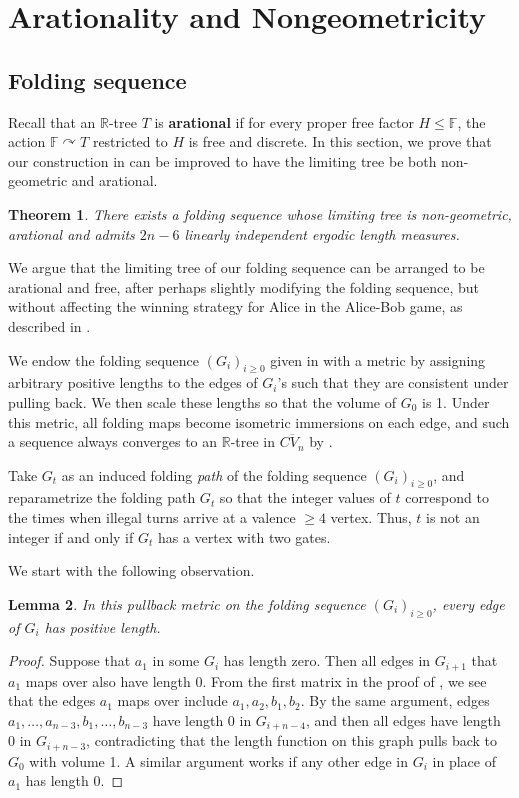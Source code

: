 \documentclass[11pt, letterpaper]{amsart}
\theoremstyle{plain}
\newtheorem{theorem}{Theorem}[section]
\newtheorem{lemma}[theorem]{Lemma}
\theoremstyle{definition}
\newcommand{\R}{\mathbb{R}}
\newcommand{\bbF}{\mathbb{F}}
\newcommand{\ov}[1]{\overline{#1}}
\begin{document}
\section{Arationality and Nongeometricity} \label{sec:arationality}
\subsection{Folding sequence}
Recall that an $\R$-tree $T$ is \textbf{arational} if for every proper free
factor $H \le \bbF$, the action $\bbF \curvearrowright T$ restricted to $H$ is
free and discrete. In this section, we prove that our construction in
 can be improved to have the limiting tree be both non-geometric and arational.
\begin{theorem} \label{thm:arational_folding}
    There exists a folding sequence whose limiting tree is non-geometric, arational and admits $2n-6$ linearly independent ergodic length measures.
\end{theorem}
We argue that the limiting tree of our folding sequence can be arranged to be arational and free, after perhaps slightly modifying the folding sequence, but without affecting the winning strategy for Alice in the Alice-Bob game, as described in . 

We endow the folding sequence $(G_i)_{i \ge 0}$ given in
 with a metric by assigning arbitrary
positive lengths to the edges of $G_i$'s such that they are consistent under
pulling back. We then scale these lengths so that the volume of $G_0$ is 1. Under this
metric, all folding maps become isometric immersions on each edge, and such a
sequence always converges to an $\R$-tree in $\ov{CV_n}$ by
  . 
  
Take $G_t$ as an induced folding \emph{path} of the folding sequence
$(G_i)_{i\ge 0}$, and reparametrize the folding path $G_t$ so that the
integer values of $t$ correspond to the times when illegal turns arrive at a
valence $\ge 4$ vertex. Thus, $t$ is not an integer if and only if $G_t$ has a
vertex with two gates.

We start with the following observation.
\begin{lemma}
    In this pullback metric on the folding sequence $(G_i)_{i\ge 0}$, every edge
    of $G_i$ has positive length.
\end{lemma}

\begin{proof}
    Suppose that $a_1$ in some $G_i$ has length zero. Then all edges in
    $G_{i+1}$ that $a_1$ maps over also have length 0. From the first matrix in
    the proof of , we see that the edges
    $a_1$ maps over include $a_1,a_2,b_1,b_2$. By the same argument, edges $a_1,
    \ldots, a_{n-3}, b_1, \ldots, b_{n-3}$ have length 0 in $G_{i+n-4}$, and
    then all edges have length 0 in $G_{i+n-3}$, contradicting that the length
    function on this graph pulls back to $G_0$ with volume 1. A similar argument works if
    any other edge in $G_i$ in place of $a_1$ has length 0.
\end{proof}
\end{document}
